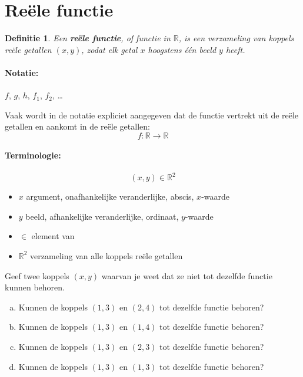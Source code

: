 \documentclass[12pt,twoside]{article}
\newtheorem{definition}{Definitie}
\begin{document}
\section{Reële functie}

\begin{theorie}
\begin{definition}
  Een {\bf reële functie}, of functie in $\mathbb{R}$, is een verzameling van {\em koppels} reële getallen $(x,y)$, zodat elk getal $x$ {\em hoogstens één beeld} $y$ heeft.
\end{definition}

\paragraph{Notatie:} $f$, $g$, $h$, $f_1$, $f_2$, \ldots

Vaak wordt in de notatie expliciet aangegeven dat de functie vertrekt uit de reële getallen en aankomt in de reële getallen:
$$f:\mathbb{R}\to\mathbb{R}$$

\paragraph{Terminologie:}
$$(x,y) \in \mathbb{R}^2$$
\begin{itemize}
  \item $x$ argument, onafhankelijke veranderlijke, abscis, $x$-waarde
  \item $y$ beeld, afhankelijke veranderlijke, ordinaat, $y$-waarde
  \item $\in$ element van
  \item $\mathbb{R}^2$ verzameling van alle koppels reële getallen
\end{itemize}

\end{theorie}

\begin{oefening}
  Geef twee koppels $(x,y)$ waarvan je weet dat ze niet tot dezelfde functie kunnen behoren.
\end{oefening}

\begin{oefening}
\begin{enumerate}[(a)]
  \item Kunnen de koppels $(1,3)$ en $(2,4)$ tot dezelfde functie behoren?
  \item Kunnen de koppels $(1,3)$ en $(1,4)$ tot dezelfde functie behoren?
  \item Kunnen de koppels $(1,3)$ en $(2,3)$ tot dezelfde functie behoren?
  \item Kunnen de koppels $(1,3)$ en $(1,3)$ tot dezelfde functie behoren?
\end{enumerate}
\end{oefening}
\end{document}
